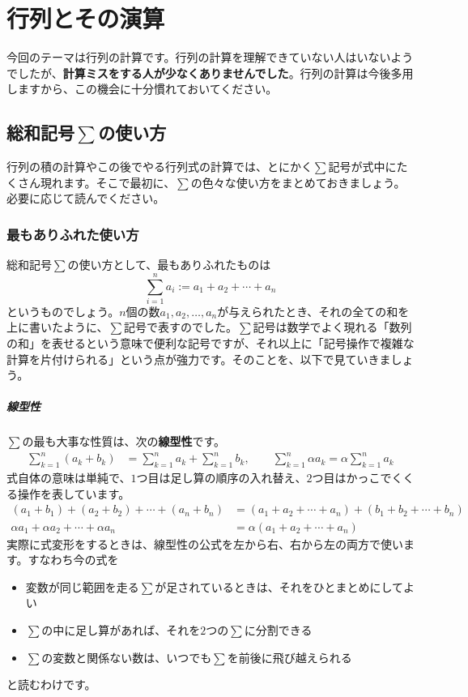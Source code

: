 \chapter{行列とその演算}


今回のテーマは行列の計算です。行列の計算を理解できていない人はいないようでしたが、\textbf{計算ミスをする人が少なくありませんでした}。行列の計算は今後多用しますから、この機会に十分慣れておいてください。

\section[総和記号Σの使い方]{総和記号$\sum$の使い方}

行列の積の計算やこの後でやる行列式の計算では、とにかく$\sum$記号が式中にたくさん現れます。そこで最初に、$\sum$の色々な使い方をまとめておきましょう。必要に応じて読んでください。

\subsection{最もありふれた使い方}

総和記号$\sum$の使い方として、最もありふれたものは
\[
\sum_{i = 1}^n a_i := a_1 + a_2  + \cdots + a_n
\]
というものでしょう。$n$個の数$a_1,a_2,\ldots,a_n$が与えられたとき、それの全ての和を上に書いたように、$\sum$記号で表すのでした。$\sum$記号は数学でよく現れる「数列の和」を表せるという意味で便利な記号ですが、それ以上に「記号操作で複雑な計算を片付けられる」という点が強力です。そのことを、以下で見ていきましょう。

\paragraph{線型性}
$\sum$の最も大事な性質は、次の\textbf{線型性}です。
\begin{align*}
\sum_{k = 1}^n  (a_k + b_k) &= \sum_{k = 1}^n a_k + \sum_{k = 1}^n b_k, \qquad
\sum_{k = 1}^n \alpha a_k = \alpha \sum_{k = 1}^n a_k
\end{align*}
式自体の意味は単純で、$1$つ目は足し算の順序の入れ替え、$2$つ目はかっこでくくる操作を表しています。
\begin{align*}
(a_1 + b_1) + (a_2 + b_2) + \cdots + (a_n + b_n) &= (a_1 + a_ 2 + \cdots + a_n) + (b_1 + b_2 + \cdots + b_n) \\
\alpha a_1 + \alpha a_2 + \cdots + \alpha a_n &= \alpha (a_1 + a_2 + \cdots + a_n)
\end{align*}
実際に式変形をするときは、線型性の公式を左から右、右から左の両方で使います。すなわち今の式を
\begin{itemize}
\item 変数が同じ範囲を走る$\sum$が足されているときは、それをひとまとめにしてよい
\item $\sum$の中に足し算があれば、それを$2$つの$\sum$に分割できる
\item $\sum$の変数と関係ない数は、いつでも$\sum$を前後に飛び越えられる
\end{itemize}
と読むわけです。


